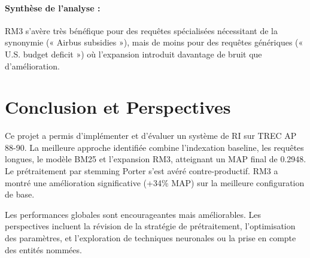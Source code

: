 \documentclass[11pt,a4paper]{article}
\begin{document}
\paragraph{Synthèse de l'analyse :}  
RM3 s’avère très bénéfique pour des requêtes spécialisées nécessitant  
de la synonymie (« Airbus subsidies »), mais de moins pour des requêtes génériques  
(« U.S. budget deficit ») où l’expansion introduit davantage de bruit que d’amélioration.


\section{Conclusion et Perspectives}
\label{sec:conclusion}
Ce projet a permis d'implémenter et d'évaluer un système de RI sur TREC AP 88-90. La meilleure approche identifiée combine l'indexation baseline, les requêtes longues, le modèle BM25 et l'expansion RM3, atteignant un MAP final de 0.2948. Le prétraitement par stemming Porter s'est avéré contre-productif. RM3 a montré une amélioration significative (+34\% MAP) sur la meilleure configuration de base.

Les performances globales sont encourageantes mais améliorables. Les perspectives incluent la révision de la stratégie de prétraitement, l'optimisation des paramètres, et l'exploration de techniques neuronales ou la prise en compte des entités nommées.


\nocite{*}
\clearpage
\tableofcontents
\end{document}
